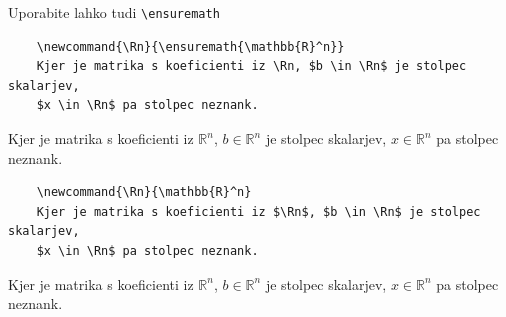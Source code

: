 \documentclass{beamer}
\begin{document}
\begin{frame}[fragile]{Uporabite lahko tudi \texttt{\textbackslash ensuremath}}
    \begin{sprejemljivoenv}
    \begin{verbatim}
    \newcommand{\Rn}{\ensuremath{\mathbb{R}^n}}
    Kjer je matrika s koeficienti iz \Rn, $b \in \Rn$ je stolpec skalarjev,
    $x \in \Rn$ pa stolpec neznank.
    \end{verbatim}
    \newcommand{\Rn}{\ensuremath{\mathbb{R}^n}}
    Kjer je matrika s koeficienti iz \Rn, $b \in \Rn$ je stolpec skalarjev, $x \in \Rn$ pa stolpec neznank.
    \end{sprejemljivoenv}

    \begin{dobroenv}[Bolje]
    \begin{verbatim}
    \newcommand{\Rn}{\mathbb{R}^n}
    Kjer je matrika s koeficienti iz $\Rn$, $b \in \Rn$ je stolpec skalarjev,
    $x \in \Rn$ pa stolpec neznank.
    \end{verbatim}
    \newcommand{\Rn}{\mathbb{R}^n}
    Kjer je matrika s koeficienti iz $\Rn$, $b \in \Rn$ je stolpec skalarjev, $x \in \Rn$ pa stolpec neznank.
    \end{dobroenv}
\end{frame}
\end{document}
